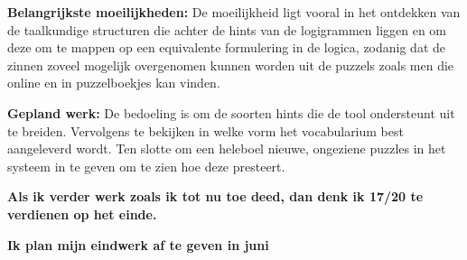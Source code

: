 \documentclass[12pt]{report}
\begin{document}
\vspace{1cm}
{\bf Belangrijkste moeilijkheden:}
De moeilijkheid ligt vooral in het ontdekken van de taalkundige structuren die achter de hints van de logigrammen liggen en om deze om te mappen op een equivalente formulering in de logica, zodanig dat de zinnen zoveel mogelijk overgenomen kunnen worden uit de puzzels zoals men die online en in puzzelboekjes kan vinden.

\vspace{1cm}
{\bf Gepland werk:} 
De bedoeling is om de soorten hints die de tool ondersteunt uit te breiden. Vervolgens te bekijken in welke vorm het vocabularium best aangeleverd wordt. Ten slotte om een heleboel nieuwe, ongeziene puzzles in het systeem in te geven om te zien hoe deze presteert.

\vspace{1cm}
{\bf Als ik verder werk zoals ik tot nu toe deed, dan denk ik 17/20 te verdienen op het einde.}

{\bf Ik plan mijn eindwerk af te geven in juni}
\end{document}
